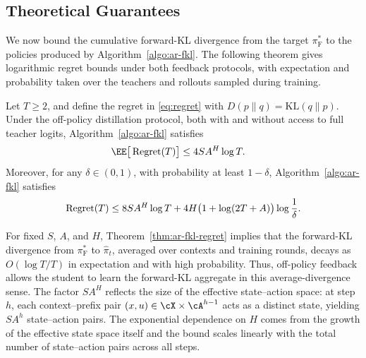 \documentclass[11pt]{article}
\newcommand{\KL}{\text{KL}}
\newcommand{\pif}{\pi_{\mathrm{F}}}
\begin{document}
\subsection{Theoretical Guarantees}
We now bound the cumulative forward-KL divergence from the target $\pif^*$ to the policies produced by Algorithm~\ref{algo:ar-fkl}. The following theorem gives logarithmic regret bounds under both feedback protocols, with expectation and probability taken over the teachers and rollouts sampled during training.
\begin{theorem}
\label{thm:ar-fkl-regret}
Let $T\geq2$, and define the regret in \eqref{eq:regret} with $D(p\|q)=\KL(q\|p)$. Under the off-policy distillation protocol, both with and without access to full teacher logits, Algorithm~\ref{algo:ar-fkl} satisfies
\begin{align}
\notag
    \EE\big[\operatorname{Regret}(T)\big]
    &
    \notag
    \le 4SA^H \log T.
\end{align}
Moreover, for any $\delta\in(0,1)$, with probability at least $1-\delta$, Algorithm~\ref{algo:ar-fkl} satisfies
\begin{align}
    \operatorname{Regret}(T)
    \leq
    8S A^H\log T
    +
    4H\bigl(1+\log(2T+A)\bigr)
    \log\frac1\delta.
\notag
\end{align}
\end{theorem}
For fixed $S$, $A$, and $H$, Theorem~\ref{thm:ar-fkl-regret} implies that the forward-KL divergence from $\pif^*$ to $\hat\pi_t$, averaged over contexts and training rounds, decays as $O(\log T/T)$ in expectation and with high probability. Thus, off-policy feedback allows the student to learn the forward-KL aggregate in this average-divergence sense. The factor $SA^H$ reflects the size of the effective state--action space: at step $h$, each context--prefix pair $(x,u)\in\cX\times\cA^{h-1}$ acts as a distinct state, yielding $SA^h$ state--action pairs. The exponential dependence on $H$ comes from the growth of the effective state space itself and the bound scales linearly with the total number of state--action pairs across all steps. %
\end{document}
